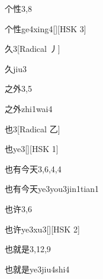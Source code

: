 \begin{entry}{个性}{3,8}
  \begin{phonetics}{个性}{ge4xing4}[][HSK 3]
  \end{phonetics}
\end{entry}

\begin{entry}{久}{3}[Radical 丿]
  \begin{phonetics}{久}{jiu3}
  \end{phonetics}
\end{entry}

\begin{entry}{之外}{3,5}
  \begin{phonetics}{之外}{zhi1wai4}
  \end{phonetics}
\end{entry}

\begin{entry}{也}{3}[Radical 乙]
  \begin{phonetics}{也}{ye3}[][HSK 1]
  \end{phonetics}
\end{entry}

\begin{entry}{也有今天}{3,6,4,4}
  \begin{phonetics}{也有今天}{ye3you3jin1tian1}
  \end{phonetics}
\end{entry}

\begin{entry}{也许}{3,6}
  \begin{phonetics}{也许}{ye3xu3}[][HSK 2]
  \end{phonetics}
\end{entry}

\begin{entry}{也就是}{3,12,9}
  \begin{phonetics}{也就是}{ye3jiu4shi4}
  \end{phonetics}
\end{entry}

